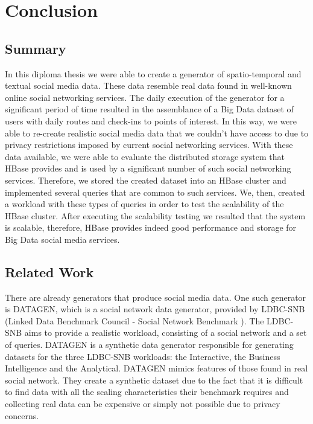 \chapter{Conclusion}

\section{Summary}

In this diploma thesis we were able to create a generator of spatio-temporal and textual social media data. These data resemble real data found in well-known online 
social networking services. The daily execution of the generator for a significant period of time resulted in the assemblance of a Big Data dataset of users with daily routes and 
check-ins to points of interest. In this way, we were able to re-create realistic social media data that we couldn't have access to due to privacy restrictions imposed by 
current social networking services. With these data available, we were able to evaluate the distributed storage system that HBase provides and is used by a significant 
number of such social networking services. Therefore, we stored the created dataset into an HBase cluster and implemented several queries that are common to such 
services. We, then, created a workload with these types of queries in order to test the scalability of the HBase cluster. After executing the scalability testing 
we resulted that the system is scalable, therefore, HBase provides indeed good performance and storage for Big Data social media services. 

\section{Related Work}

There are already generators that produce social media data. One such generator is DATAGEN, which is a social network data generator, provided by LDBC-SNB 
(Linked Data Benchmark Council - Social Network Benchmark \cite{26}). The LDBC-SNB aims to provide a realistic workload, consisting of a social network and a set of queries. 
DATAGEN is a synthetic data generator responsible for generating datasets for the three LDBC-SNB workloads: the Interactive, the Business Intelligence and the Analytical. 
DATAGEN mimics features of those found in real social network. They create a synthetic dataset due to the fact that it is difficult to find data with all the 
scaling characteristics their benchmark requires and collecting real data can be expensive or simply not possible due to privacy concerns.

